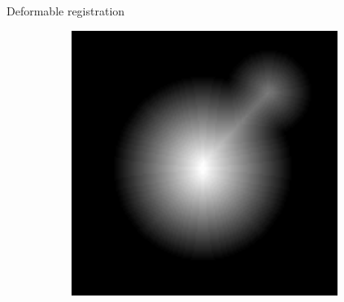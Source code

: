 \documentclass[10pt]{beamer}
\begin{document}
\begin{frame}{Deformable registration}
\begin{figure}[ht]
\begin{subfigure}[t]{0.2\textwidth}
    \caption{}
    \label{subfig:registration_dt_target_interpol}
  \end{subfigure}%
  \begin{subfigure}[t]{0.2\textwidth}
    \centering
    \includegraphics[width=0.95\textwidth]{fig/registration_target_dt}
    \caption{}
    \label{subfig:registration_dt_target}
  \end{subfigure}%
\end{figure}
\end{frame}
\end{document}
